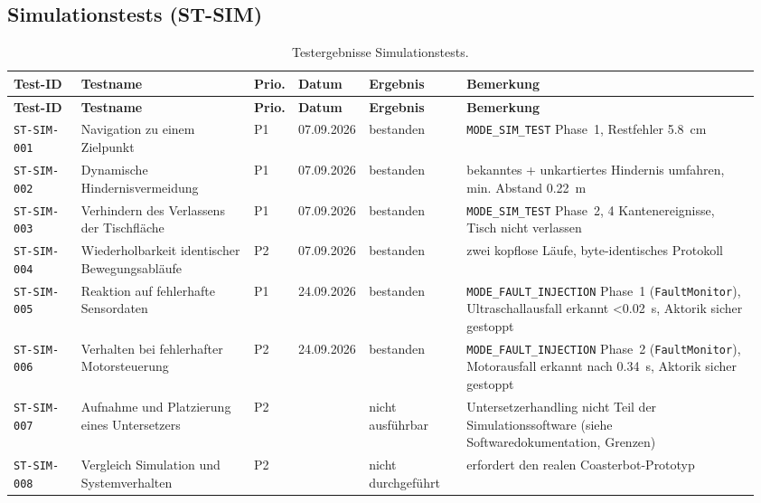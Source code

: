 \documentclass[
  a4paper,
  12pt,
  DIV=12,        %
  parskip=half,  %
  headings=small %
]{scrartcl}
\theoremstyle{definition}
\theoremstyle{definition}
\begin{document}
\begin{landscape}
\subsection{Simulationstests (ST-SIM)}\label{st-sim-ergebnisse}
\begin{longtable}[]{@{}
  p{0.09\linewidth}p{0.23\linewidth}p{0.04\linewidth}p{0.08\linewidth}p{0.13\linewidth}p{0.39\linewidth}@{}}
\caption{Testergebnisse Simulationstests.}\\
\toprule
\textbf{Test-ID} & \textbf{Testname} & \textbf{Prio.} & \textbf{Datum} & \textbf{Ergebnis} & \textbf{Bemerkung}\\
\midrule
\endfirsthead
\toprule
\textbf{Test-ID} & \textbf{Testname} & \textbf{Prio.} & \textbf{Datum} & \textbf{Ergebnis} & \textbf{Bemerkung}\\
\midrule
\endhead
\bottomrule
\endfoot
\texttt{ST-SIM-001} & Navigation zu einem Zielpunkt & P1 & 07.09.2026 & bestanden & \texttt{MODE\_SIM\_TEST} Phase~1, Restfehler \SI{5.8}{\centi\meter}\\
\texttt{ST-SIM-002} & Dynamische Hindernisvermeidung & P1 & 07.09.2026 & bestanden & bekanntes + unkartiertes Hindernis umfahren, min. Abstand \SI{0.22}{\meter}\\
\texttt{ST-SIM-003} & Verhindern des Verlassens der Tischfläche & P1 & 07.09.2026 & bestanden & \texttt{MODE\_SIM\_TEST} Phase~2, 4 Kantenereignisse, Tisch nicht verlassen\\
\texttt{ST-SIM-004} & Wiederholbarkeit identischer Bewegungsabläufe & P2 & 07.09.2026 & bestanden & zwei kopflose Läufe, byte-identisches Protokoll\\
\texttt{ST-SIM-005} & Reaktion auf fehlerhafte Sensordaten & P1 & 24.09.2026 & bestanden & \texttt{MODE\_FAULT\_INJECTION} Phase~1 (\texttt{FaultMonitor}), Ultraschallausfall erkannt \textless{}\SI{0.02}{\second}, Aktorik sicher gestoppt\\
\texttt{ST-SIM-006} & Verhalten bei fehlerhafter Motorsteuerung & P2 & 24.09.2026 & bestanden & \texttt{MODE\_FAULT\_INJECTION} Phase~2 (\texttt{FaultMonitor}), Motorausfall erkannt nach \SI{0.34}{\second}, Aktorik sicher gestoppt\\
\texttt{ST-SIM-007} & Aufnahme und Platzierung eines Untersetzers & P2 & & nicht ausführbar & Untersetzerhandling nicht Teil der Simulationssoftware (siehe Softwaredokumentation, Grenzen)\\
\texttt{ST-SIM-008} & Vergleich Simulation und Systemverhalten & P2 & & nicht durchgeführt & erfordert den realen Coasterbot-Prototyp\\
\end{longtable}
\end{landscape}
\end{document}
